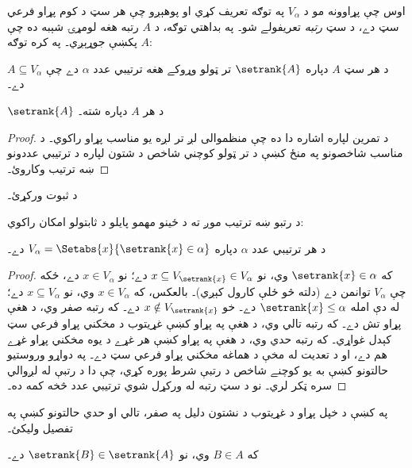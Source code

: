 \documentclass[../../../include/open-logic-section]{subfiles}
\begin{document}

اوس چې پړاوونه مو د $V_\alpha$ په توګه تعريف کړي او پوهېږو چې هر سټ
د کوم پړاو فرعي سټ دے، د سټ \emph{رتبه} تعريفولے شو۔ په بداهتي توګه،
د $A$ رتبه هغه لومړۍ شېبه ده چې $A$ پکښې جوړېږي۔ په کره توګه:

\begin{defn}
د هر سټ $A$ دپاره $\setrank{A}$ تر ټولو وړوکے هغه ترتيبي عدد $\alpha$
دے چې $A \subseteq V_\alpha$ دے۔
\end{defn}
\begin{prop}
	$\setrank{A}$ د هر $A$ دپاره شته۔
\end{prop}
\begin{proof}
	د تمرين لپاره اشاره دا ده چې منظموالی لږ تر لږه يو مناسب
	پړاو راکوي۔ د مناسب شاخصونو په منځ کښې د تر ټولو کوچني
	شاخص د شتون لپاره د ترتيبي عددونو ښه ترتيب وکاروئ۔
\end{proof}
\begin{prob}
	د  ثبوت ورکړئ۔
\end{prob}
\noindent
د رتبو ښه ترتيب موږ ته د ځينو مهمو پايلو د ثابتولو امکان راکوي:
\begin{prop}
د هر ترتيبي عدد $\alpha$ دپاره $V_\alpha = \Setabs{x}{\setrank{x} \in \alpha}$ دے۔
\end{prop}

\begin{proof}
که $\setrank{x} \in \alpha$ وي، نو $x \subseteq V_{\setrank{x}} \in
V_\alpha$ دے؛ نو $x \in V_\alpha$ دے، ځکه چې $V_\alpha$ توانمن دے
(دلته  څو ځلې کارول کېږي)۔ بالعکس،
که $x \in V_\alpha$ وي، نو $x \subseteq V_\alpha$ دے؛ له دې امله
$\setrank{x} \leq \alpha$ دے۔ خو $x \notin V_{\setrank{x}}$
دے۔ که رتبه صفر وي، د هغې پړاو تش دے۔ که رتبه تالي وي،
د هغې په پړاو کښې غړيتوب د مخکني پړاو فرعي سټ کېدل
غواړي۔ که رتبه حدي وي، د هغې په پړاو کښې هر غړے د يوه
مخکني پړاو غړے هم دے، او د تعديت له مخې د هماغه مخکني
پړاو فرعي سټ دے۔ په دواړو وروستيو حالتونو کښې به يو کوچنے
شاخص د رتبې شرط پوره کړي، چې دا د رتبې له لږوالي سره ټکر
لري۔ نو د سټ رتبه له ورکړل شوي ترتيبي عدد څخه کمه ده۔
\end{proof}
\begin{prob}
	په  کښې د خپل پړاو
	د غړيتوب د نشتون دليل په صفر، تالي او حدي حالتونو کښې په
	تفصيل وليکئ۔
\end{prob}

\begin{prop}
که $B \in A$ وي، نو $\setrank{B} \in \setrank{A}$ دے۔
\end{prop}
\end{document}
